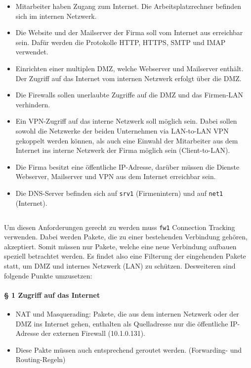 \begin{itemize}
\item Mitarbeiter haben Zugang zum Internet.
      Die Arbeitsplatzrechner befinden sich im internen Netzwerk.
\item Die Website und der Mailserver der Firma soll vom Internet
      aus erreichbar sein.
      Dafür werden die Protokolle HTTP, HTTPS, SMTP und IMAP verwendet.
\item Einrichten einer multiplen DMZ,
      welche Webserver und Mailserver enthält.
      Der Zugriff auf das Internet vom internen Netzwerk erfolgt über die DMZ.
\item Die Firewalls sollen unerlaubte Zugriffe auf die DMZ und
      das Firmen-LAN verhindern.
\item Ein VPN-Zugriff auf das interne Netzwerk soll möglich sein.
      Dabei sollen sowohl die Netzwerke der beiden Unternehmen via LAN-to-LAN
      VPN gekoppelt werden können, als auch eine Einwahl der Mitarbeiter
      aus dem Internet ins interne Netzwerk der Firma möglich sein
      (Client-to-LAN).
\item Die Firma besitzt eine öffentliche IP-Adresse, darüber müssen die Dienste
      Webserver, Mailserver und VPN aus dem Internet erreichbar sein.
\item Die DNS-Server befinden sich auf {\tt srv1} (Firmenintern) und
      auf {\tt net1} (Internet).
\end{itemize}

\subsection{\fwa}

Um diesen Anforderungen gerecht zu werden
muss {\tt fw1} Connection Tracking verwenden.
Dabei werden Pakete, die zu einer bestehenden Verbindung gehören, akzeptiert.
Somit müssen nur Pakete, welche eine neue Verbindung aufbauen speziell betrachtet
werden. Es findet also eine Filterung der eingehenden Pakete statt, um DMZ und internes Netzwerk (LAN) zu schützen.
Desweiteren sind folgende Punkte umzusetzen:

\paragraph{§ 1 Zugriff auf das Internet}
\begin{itemize}
\item NAT und Masquerading: Pakete,
      die aus dem internen Netzwerk oder der DMZ ins Internet gehen,
      enthalten als Quelladresse nur die öffentliche IP-Adresse der externen
      Firewall (10.1.0.131).
\item Diese Pakte müssen auch entsprechend geroutet werden.
      (Forwarding- und Routing-Regeln)
\end{itemize}

